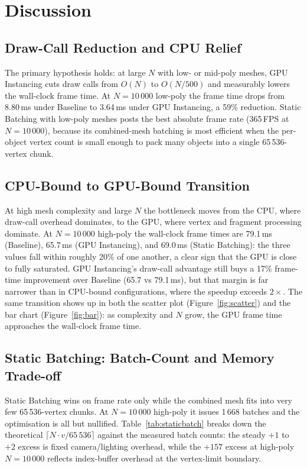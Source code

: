 \documentclass[11pt,a4paper]{article}
\begin{document}
\section{Discussion}
\label{sec:discussion}

\subsection{Draw-Call Reduction and CPU Relief}

The primary hypothesis holds: at large $N$ with low- or mid-poly meshes, GPU Instancing
cuts draw calls from $O(N)$ to $O(N/500)$ and measurably lowers the wall-clock frame
time. At $N=10\,000$ low-poly the frame time drops from 8.80\,ms under Baseline to
3.64\,ms under GPU Instancing, a 59\% reduction. Static Batching with low-poly meshes
posts the best absolute frame rate (365\,FPS at $N=10\,000$), because its combined-mesh
batching is most efficient when the per-object vertex count is small enough to pack
many objects into a single 65\,536-vertex chunk.

\subsection{CPU-Bound to GPU-Bound Transition}

At high mesh complexity and large $N$ the bottleneck moves from the CPU, where
draw-call overhead dominates, to the GPU, where vertex and fragment processing dominate.
At $N=10\,000$ high-poly the wall-clock frame times are 79.1\,ms (Baseline), 65.7\,ms
(GPU Instancing), and 69.0\,ms (Static Batching): the three values fall within roughly
20\% of one another, a clear sign that the GPU is close to fully saturated. GPU
Instancing's draw-call advantage still buys a 17\% frame-time improvement over Baseline
(65.7 vs 79.1\,ms), but that margin is far narrower than in CPU-bound configurations,
where the speedup exceeds $2\times$. The same transition shows up in both the scatter
plot (Figure~\ref{fig:scatter}) and the bar chart (Figure~\ref{fig:bar}): as complexity
and $N$ grow, the GPU frame time approaches the wall-clock frame time.

\subsection{Static Batching: Batch-Count and Memory Trade-off}
\label{sec:memtrade}

Static Batching wins on frame rate only while the combined mesh fits into very few
65\,536-vertex chunks. At $N=10\,000$ high-poly it issues 1\,668 batches and the
optimisation is all but nullified. Table~\ref{tab:staticbatch} breaks down the
theoretical $\lceil N \cdot v / 65\,536 \rceil$ against the measured batch counts: the
steady $+1$ to $+2$ excess is fixed camera/lighting overhead, while the $+157$ excess
at high-poly $N=10\,000$ reflects index-buffer overhead at the vertex-limit boundary.
\end{document}
